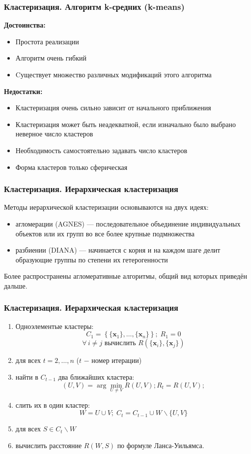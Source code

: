 \documentclass[ucs, notheorems, handout]{beamer}
\begin{document}
	\begin{frame}
	\frametitle{Кластеризация. Алгоритм k-средних (k-means)}
			\textbf{Достоинства:}
		\begin{itemize} 
			\item Простота реализации
			\item Алгоритм очень гибкий 
			\item Cуществует множество различных модификаций этого алгоритма
		\end{itemize}
		
		\textbf{Недостатки:} 
		\begin{itemize}
			\item Кластеризация очень сильно зависит от начального приближения\\
			\item Кластеризация может быть неадекватной, если изначально было выбрано неверное число кластеров 
			\item Необходимость самостоятельно задавать число кластеров\\ 
			\item Форма кластеров только сферическая
		\end{itemize}

	\end{frame}
	
	\begin{frame}
	\frametitle{Кластеризация. Иерархическая кластеризация}
		Методы иерархической кластеризации основываются на двух идеях:
	\begin{itemize}
		\item агломерации (AGNES) --- последовательное объединение индивидуальных объектов или их групп во все более крупные подмножества
		\item разбиении (DIANA) ---  начинается с корня и на каждом шаге делит образующие группы по степени их гетерогенности
	\end{itemize}

	Более распространены агломеративные алгоритмы, общий вид которых приведён дальше. 

	\end{frame}
	
	\begin{frame}
	\frametitle{Кластеризация. Иерархическая кластеризация}
			\begin{enumerate}
			\item Одноэлементые кластеры: $$C_1 = \left\{\{\pmb x_1\}, \dots, \{\pmb x_n\}\right\}; \; R_1 = 0$$ $$\forall\, i \neq j \text{ вычислить } R(\{\pmb x_i\}, \{\pmb x_j\})$$ 
			\item для всех $t = 2, \dots, n$ ($t$ $-$ номер итерации) 
			\item найти в $C_{t-1}$ два ближайших кластера: $$(U, V) = \arg \min_{U \neq V} R(U, V); R_t=R(U, V);$$
			\item слить их в один кластер: $$W = U \cup V; \; C_t = C_{t-1} \cup W \backslash \{U, V\}$$ 
			\item для всех $S \in C_t \backslash W $ 
			\item вычислить расстояние $R(W, S)$ по формуле Ланса-Уильямса.
			\end{enumerate}


	\end{frame}
	
\end{document}
